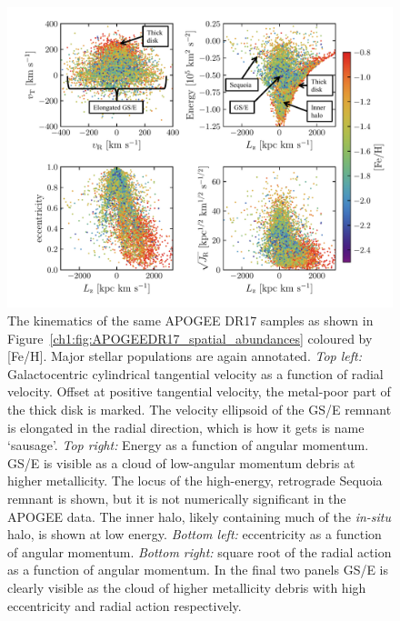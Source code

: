 \begin{figure}
	\centering
	\includegraphics[width=\textwidth]{figure/ch1/apogee_dr17_kinematics.pdf}
	\caption{The kinematics of the same APOGEE DR17 samples as shown in Figure~\ref{ch1:fig:APOGEEDR17_spatial_abundances} coloured by [Fe/H]. Major stellar populations are again annotated. \textit{Top left:} Galactocentric cylindrical tangential velocity as a function of radial velocity. Offset at positive tangential velocity, the metal-poor part of the thick disk is marked. The velocity ellipsoid of the GS/E remnant is elongated in the radial direction, which is how it gets is name `sausage'. \textit{Top right:} Energy as a function of angular momentum. GS/E is visible as a cloud of low-angular momentum debris at higher metallicity. The locus of the high-energy, retrograde Sequoia remnant is shown, but it is not numerically significant in the APOGEE data. The inner halo, likely containing much of the \textit{in-situ} halo, is shown at low energy. \textit{Bottom left:} eccentricity as a function of angular momentum. \textit{Bottom right:} square root of the radial action as a function of angular momentum. In the final two panels GS/E is clearly visible as the cloud of higher metallicity debris with high eccentricity and radial action respectively.}
	\label{ch1:fig:APOGEEDR17_kinematics}
\end{figure}

